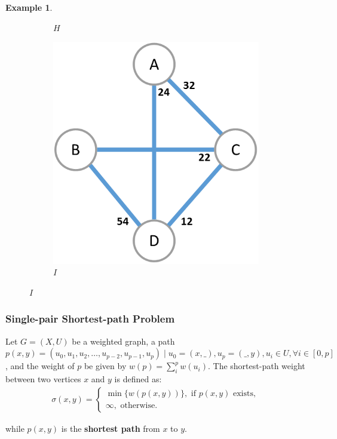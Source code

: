 \documentclass[12pt]{report}
\newtheorem{example}{Example}[section]
\begin{document}
\begin{example}
\begin{figure}[H]
\begin{subfigure}{.33\linewidth}
			\caption{$H$}
			\label{fig:example-graph-nn}
		\end{subfigure}%
		\begin{subfigure}{.33\linewidth}
			\centering
			\includegraphics[width=.8\linewidth]{graphs/example-graph-en}
			\caption{$I$}
			\label{fig:example-graph-en}
		\end{subfigure}
	\end{figure}
\end{example}

\subsubsection{Single-pair Shortest-path Problem \cite{cor2011}}

Let $G=(X, U)$ be a weighted graph, a path $p(x, y)=(u_0, u_1, u_2, \dots, u_{p-2}, u_{p-1}, u_{p}) \mid u_0 = (x, \_), u_p = (\_, y), u_i \in U, \forall i \in [0, p]$, and the weight of $p$ be given by $w(p) = \sum_i^p w(u_i)$. The shortest-path weight between two vertices $x$ and $y$ is defined as:
\begin{align*}
	\sigma(x, y) = \begin{cases}
		\min \{w(p(x, y))\}, \text{ if $p(x, y)$ exists}, \\
		\infty, \text{ otherwise.}
	\end{cases}
\end{align*}

while $p(x, y)$ is the \textbf{shortest path} from $x$ to $y$.
\end{document}
